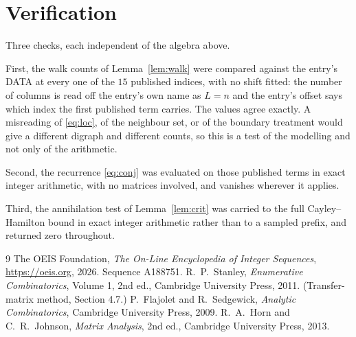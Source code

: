 \documentclass[11pt,a4paper]{article}
\theoremstyle{plain}
\theoremstyle{definition}
\begin{document}
\section{Verification}

Three checks, each independent of the algebra above.

First, the walk counts of Lemma~\ref{lem:walk} were compared against the entry's DATA at
every one of the $15$ published indices, with no shift fitted: the number of columns is
read off the entry's own name as $L=n$ and the entry's offset says which index the first
published term carries. The values agree exactly. A misreading of \eqref{eq:loc}, of the
neighbour set, or of the boundary treatment would give a different digraph and different
counts, so this is a test of the modelling and not only of the arithmetic.

Second, the recurrence \eqref{eq:conj} was evaluated on those published terms in exact
integer arithmetic, with no matrices involved, and vanishes wherever it applies.

Third, the annihilation test of Lemma~\ref{lem:crit} was carried to the full
Cayley--Hamilton bound in exact integer arithmetic rather than to a sampled prefix, and
returned zero throughout.

\begin{thebibliography}{9}
 The OEIS Foundation, \emph{The On-Line Encyclopedia of Integer
Sequences}, \url{https://oeis.org}, 2026. Sequence A188751.
 R.~P.~Stanley, \emph{Enumerative Combinatorics}, Volume 1, 2nd ed.,
Cambridge University Press, 2011. (Transfer-matrix method, Section 4.7.)
 P.~Flajolet and R.~Sedgewick, \emph{Analytic Combinatorics}, Cambridge
University Press, 2009.
 R.~A.~Horn and C.~R.~Johnson, \emph{Matrix Analysis}, 2nd ed., Cambridge
University Press, 2013.
\end{thebibliography}
\end{document}
